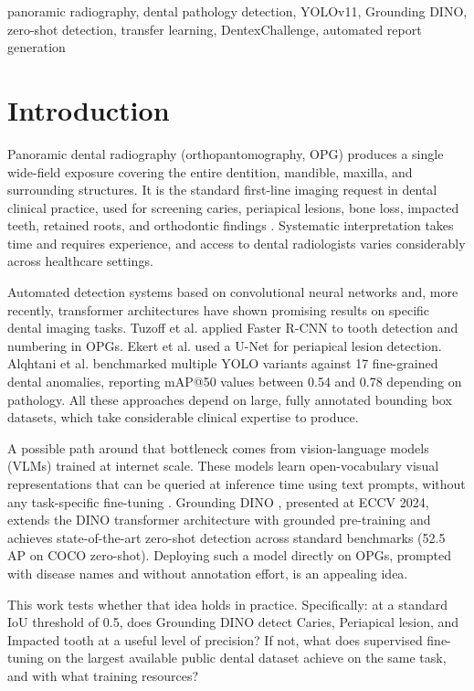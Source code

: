 \documentclass[conference]{IEEEtran}
\begin{document}
\begin{IEEEkeywords}
panoramic radiography, dental pathology detection, YOLOv11, Grounding DINO, zero-shot detection, transfer learning, DentexChallenge, automated report generation
\end{IEEEkeywords}

\section{Introduction}

Panoramic dental radiography (orthopantomography, OPG) produces a single wide-field exposure covering the entire dentition, mandible, maxilla, and surrounding structures. It is the standard first-line imaging request in dental clinical practice, used for screening caries, periapical lesions, bone loss, impacted teeth, retained roots, and orthodontic findings \cite{ludlow2006}. Systematic interpretation takes time and requires experience, and access to dental radiologists varies considerably across healthcare settings.

Automated detection systems based on convolutional neural networks and, more recently, transformer architectures have shown promising results on specific dental imaging tasks. Tuzoff et al. \cite{tuzoff2019} applied Faster R-CNN to tooth detection and numbering in OPGs. Ekert et al. \cite{ekert2019} used a U-Net for periapical lesion detection. Alqhtani et al. \cite{alqhtani2025} benchmarked multiple YOLO variants against 17 fine-grained dental anomalies, reporting mAP@50 values between 0.54 and 0.78 depending on pathology. All these approaches depend on large, fully annotated bounding box datasets, which take considerable clinical expertise to produce.

A possible path around that bottleneck comes from vision-language models (VLMs) trained at internet scale. These models learn open-vocabulary visual representations that can be queried at inference time using text prompts, without any task-specific fine-tuning \cite{radford2021}. Grounding DINO \cite{liu2024gdino}, presented at ECCV 2024, extends the DINO transformer architecture with grounded pre-training and achieves state-of-the-art zero-shot detection across standard benchmarks (52.5 AP on COCO zero-shot). Deploying such a model directly on OPGs, prompted with disease names and without annotation effort, is an appealing idea.

This work tests whether that idea holds in practice. Specifically: at a standard IoU threshold of 0.5, does Grounding DINO detect Caries, Periapical lesion, and Impacted tooth at a useful level of precision? If not, what does supervised fine-tuning on the largest available public dental dataset achieve on the same task, and with what training resources?
\end{document}
